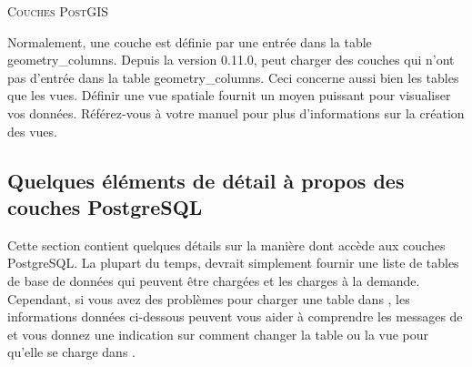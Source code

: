 \begin{Tip}\caption{\textsc{Couches PostGIS}}
Normalement, une couche \pg est définie par une entrée dans la table geometry\_columns. 
Depuis la version 0.11.0, \qg peut charger des couches qui n'ont pas d'entrée dans la 
table geometry\_columns. Ceci concerne aussi bien les tables que les vues. Définir une 
vue spatiale fournit un moyen puissant pour visualiser vos données. Référez-vous à 
votre manuel \psq pour plus d'informations sur la création des vues.
\end{Tip}

\subsection{Quelques éléments de détail à propos des couches PostgreSQL} \label{sec:postgis_details}

Cette section contient quelques détails sur la manière dont \qg accède aux 
couches PostgreSQL. La plupart du temps, \qg devrait simplement fournir une 
liste de tables de base de données qui peuvent être chargées et les charges à la 
demande. Cependant, si vous avez des problèmes pour charger une table \psq dans 
\qg, les informations données ci-dessous peuvent vous aider à comprendre les 
messages de \qg et vous donnez une indication sur comment changer la table ou 
la vue \psq pour qu'elle se charge dans \qg.

